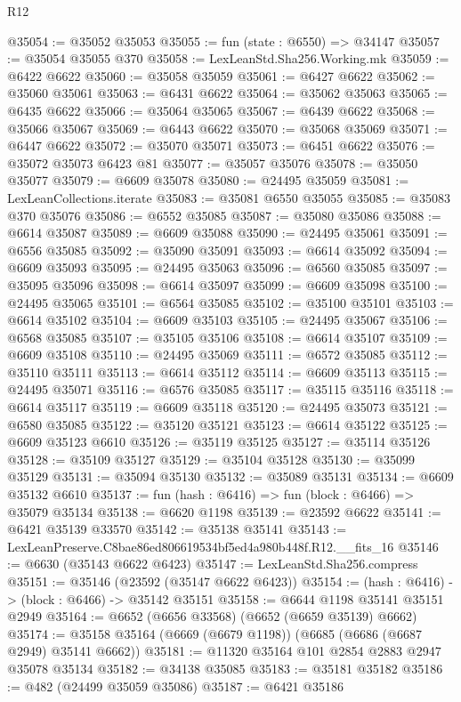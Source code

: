 \begin{lexlean}{R12}
\begin{coremodule}
@35054 := @35052 @35053
@35055 := fun (state : @6550) => @34147
@35057 := @35054 @35055 @370
@35058 := LexLeanStd.Sha256.Working.mk
@35059 := @6422 @6622
@35060 := @35058 @35059
@35061 := @6427 @6622
@35062 := @35060 @35061
@35063 := @6431 @6622
@35064 := @35062 @35063
@35065 := @6435 @6622
@35066 := @35064 @35065
@35067 := @6439 @6622
@35068 := @35066 @35067
@35069 := @6443 @6622
@35070 := @35068 @35069
@35071 := @6447 @6622
@35072 := @35070 @35071
@35073 := @6451 @6622
@35076 := @35072 @35073 @6423 @81
@35077 := @35057 @35076
@35078 := @35050 @35077
@35079 := @6609 @35078
@35080 := @24495 @35059
@35081 := LexLeanCollections.iterate
@35083 := @35081 @6550 @35055
@35085 := @35083 @370 @35076
@35086 := @6552 @35085
@35087 := @35080 @35086
@35088 := @6614 @35087
@35089 := @6609 @35088
@35090 := @24495 @35061
@35091 := @6556 @35085
@35092 := @35090 @35091
@35093 := @6614 @35092
@35094 := @6609 @35093
@35095 := @24495 @35063
@35096 := @6560 @35085
@35097 := @35095 @35096
@35098 := @6614 @35097
@35099 := @6609 @35098
@35100 := @24495 @35065
@35101 := @6564 @35085
@35102 := @35100 @35101
@35103 := @6614 @35102
@35104 := @6609 @35103
@35105 := @24495 @35067
@35106 := @6568 @35085
@35107 := @35105 @35106
@35108 := @6614 @35107
@35109 := @6609 @35108
@35110 := @24495 @35069
@35111 := @6572 @35085
@35112 := @35110 @35111
@35113 := @6614 @35112
@35114 := @6609 @35113
@35115 := @24495 @35071
@35116 := @6576 @35085
@35117 := @35115 @35116
@35118 := @6614 @35117
@35119 := @6609 @35118
@35120 := @24495 @35073
@35121 := @6580 @35085
@35122 := @35120 @35121
@35123 := @6614 @35122
@35125 := @6609 @35123 @6610
@35126 := @35119 @35125
@35127 := @35114 @35126
@35128 := @35109 @35127
@35129 := @35104 @35128
@35130 := @35099 @35129
@35131 := @35094 @35130
@35132 := @35089 @35131
@35134 := @6609 @35132 @6610
@35137 := fun (hash : @6416) => fun (block : @6466) => @35079 @35134
@35138 := @6620 @1198
@35139 := @23592 @6622
@35141 := @6421 @35139 @33570
@35142 := @35138 @35141
@35143 := LexLeanPreserve.C8bae86ed806619534bf5ed4a980b448f.R12.__fits_16
@35146 := @6630 (@35143 @6622 @6423)
@35147 := LexLeanStd.Sha256.compress
@35151 := @35146 (@23592 (@35147 @6622 @6423))
@35154 := (hash : @6416) -> (block : @6466) -> @35142 @35151
@35158 := @6644 @1198 @35141 @35151 @2949
@35164 := @6652 (@6656 @33568) (@6652 (@6659 @35139) @6662)
@35174 := @35158 @35164 (@6669 (@6679 @1198)) (@6685 (@6686 (@6687 @2949) @35141 @6662))
@35181 := @11320 @35164 @101 @2854 @2883 @2947 @35078 @35134
@35182 := @34138 @35085
@35183 := @35181 @35182
@35186 := @482 (@24499 @35059 @35086)
@35187 := @6421 @35186

\end{coremodule}
\end{lexlean}
